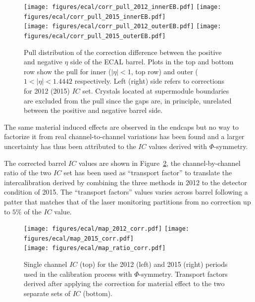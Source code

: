 \begin{figure}[h!]
  \centering
  \texttt{[image: figures/ecal/corr\_pull\_2012\_innerEB.pdf]}
  \texttt{[image: figures/ecal/corr\_pull\_2015\_innerEB.pdf]}\\
  \texttt{[image: figures/ecal/corr\_pull\_2012\_outerEB.pdf]}
  \texttt{[image: figures/ecal/corr\_pull\_2015\_outerEB.pdf]}
  \caption{Pull distribution of the correction difference between the positive and negative $\eta$ side of the ECAL barrel.
    Plots in the top and bottom row show the pull for inner ($|\eta| < 1$, top row) and outer ($1 < |\eta| < 1.4442$
    respectively. Left (right) side refers to corrections for 2012 (2015) $IC$ set. Crystals located at supermodule
    boundaries are excluded from the pull since the gaps are, in principle, unrelated between the positive and negative
  barrel side.}
  \label{fig:correction_pull}
\end{figure}


The same material induced effects are observed in the endcaps but no way to factorize it from real channel-to-channel
variations has been found and a larger uncertainty has thus been attributed to the $IC$ values derived with $\Phi$-symmetry.

The corrected barrel $IC$ values are shown in Figure~\ref{fig:ic_corrected},
the channel-by-channel ratio of the two $IC$ set %
has been used as ``transport factor'' to translate the intercalibration
derived by combining the three methods in 2012 to the detector condition of 2015.
The ``transport factors'' values varies across barrel following a patter that matches that of the laser monitoring
partitions from no correction up to $5\%$ of the $IC$ value. %

\begin{figure}[h!]
  \centering
  \texttt{[image: figures/ecal/map\_2012\_corr.pdf]}
  \texttt{[image: figures/ecal/map\_2015\_corr.pdf]}\\
  \texttt{[image: figures/ecal/map\_ratio\_corr.pdf]}  
  \caption{Single channel $IC$ (top) for the 2012 (left) and 2015 (right) periods used in the calibration process with
    $\Phi$-symmetry. Transport factors derived after applying the correction for material effect to the two
    separate sets of $IC$ (bottom).}
  \label{fig:ic_corrected}
\end{figure}

